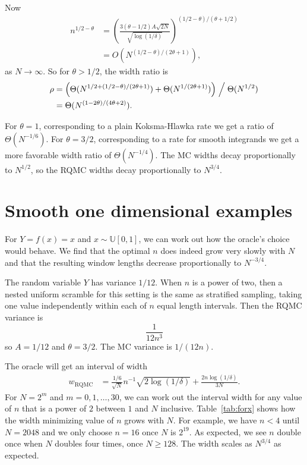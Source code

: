 \documentclass{article}
\renewcommand{\ge}{\geqslant}
\newcommand{\rqmc}{\mathrm{RQMC}}
\newcommand{\runif}{\mathbb{U}}
\begin{document}
Now
\begin{align*}
n^{1/2-\theta} 
&= \left(\frac
{3(\theta-1/2)A
  \sqrt{2N}}{\sqrt{\log(1/\delta)}}\right)^{(1/2-\theta)/(\theta+1/2)}\\
&= O( N^{(1/2-\theta)/(2\theta+1)}),
\end{align*}
as $N\to\infty$. So for $\theta>1/2$, the width ratio is
\begin{align*}
\rho&=\Bigl(
\Theta(N^{1/2+(1/2-\theta)/(2\theta+1)})
+ \Theta( N^{1/(2\theta+1)})
\Bigr)\Bigm/
\Theta(N^{1/2})\\
&=\Theta( N^{(1-2\theta)/(4\theta+2)}).
\end{align*}

For $\theta=1$, corresponding to a plain Koksma-Hlawka rate
we get a ratio of $\Theta(N^{-1/6})$.
For $\theta=3/2$, corresponding to a rate for smooth integrands
we get a more favorable width ratio of $\Theta(N^{-1/4})$.
The MC widths decay proportionally to $N^{1/2}$, so the
RQMC widths decay proportionally to $N^{3/4}$.

\section{Smooth one dimensional examples}

For $Y=f(x)=x$ and $x\sim \runif[0,1]$, we can work out how the oracle's
choice would behave.  We find that the optimal $n$ does indeed grow
very slowly with $N$ and that the resulting window lengths
decrease proportionally to $N^{-3/4}$.


The random variable $Y$ has variance $1/12$.
When $n$ is a power of two, then a nested uniform scramble for this setting is
the same as stratified sampling, taking one value independently
within each of $n$ equal length intervals. Then the RQMC variance is
$$
\frac{1}{12n^3}
$$
so $A=1/12$ and $\theta=3/2$.  
The MC variance is $1/(12n)$.

The oracle will get an interval of width
\begin{align*}
w_{\rqmc}&=\frac{1/6}{\sqrt{N}}n^{-1}\sqrt{2\log(1/\delta)}  + \frac{2n\log(1/\delta)}{3N}.
\end{align*}
For $N = 2^m$ and $m=0,1,\dots,30$, we can work out the
interval width for any value of $n$ that is a power of $2$
between $1$ and $N$ inclusive. Table~\ref{tab:forx} shows
how the width minimizing value of $n$ grows with $N$.
For example, we have $n<4$ until $N=2048$ and we only choose
$n=16$ once $N$ is $2^{19}$.  As expected, we see $n$ double
once when $N$ doubles four times, once $N\ge128$. The width scales as $N^{3/4}$
as expected.
\end{document}
